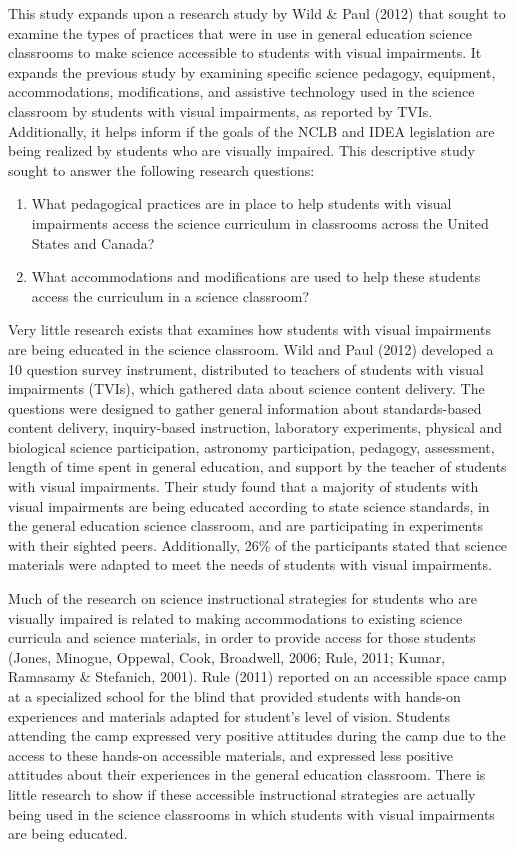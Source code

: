 \documentclass[11.5pt]{sig-alternate} %
\begin{document}
\begin{large}
This study expands upon a research study by Wild \& Paul (2012) that sought to examine the types of practices that were in use in general education science classrooms to make science accessible to students with visual impairments.  It expands the previous study by examining specific science pedagogy, equipment, accommodations, modifications, and assistive technology used in the science classroom by students with visual impairments, as reported by TVIs.  Additionally, it helps inform if the goals of the NCLB and IDEA legislation are being realized by students who are visually impaired.  This descriptive study sought to answer the following research questions:

\begin{enumerate}
    \item What pedagogical practices are in place to help students with visual impairments access the science curriculum in classrooms across the United States and Canada?
    \item What accommodations and modifications are used to help these students access the curriculum in a science classroom?
\end{enumerate}

Very little research exists that examines how students with visual impairments are being educated in the science classroom.  Wild and Paul (2012) developed a 10 question survey instrument, distributed to teachers of students with visual impairments (TVIs), which gathered data about science content delivery.  The questions were designed to gather general information about standards-based content delivery, inquiry-based instruction, laboratory experiments, physical and biological science participation, astronomy participation, pedagogy, assessment, length of time spent in general education, and support by the teacher of students with visual impairments.  Their study found that a majority of students with visual impairments are being educated according to state science standards, in the general education science classroom, and are participating in experiments with their sighted peers.  Additionally, 26\% of the participants stated that science materials were adapted to meet the needs of students with visual impairments.  

Much of the research on science instructional strategies for students who are visually impaired is related to making accommodations to existing science curricula and science materials, in order to provide access for those students (Jones, Minogue, Oppewal, Cook, Broadwell, 2006; Rule, 2011; Kumar, Ramasamy \& Stefanich, 2001).  Rule (2011) reported on an accessible space camp at a specialized school for the blind that provided students with hands-on experiences and materials adapted for student’s level of vision.  Students attending the camp expressed very positive attitudes during the camp due to the access to these hands-on accessible materials, and expressed less positive attitudes about their experiences in the general education classroom.  There is little research to show if these accessible instructional strategies are actually being used in the science classrooms in which students with visual impairments are being educated.  


\end{large}
\end{document}
